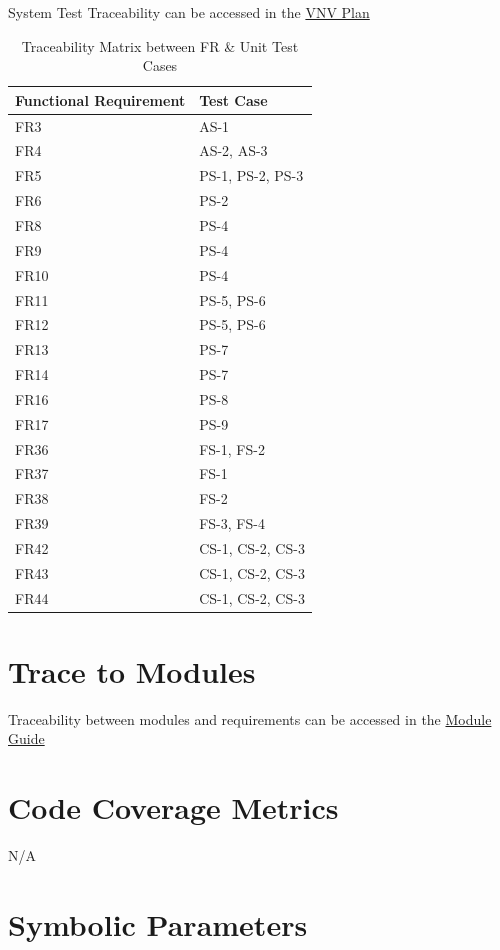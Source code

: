 \documentclass[12pt, titlepage]{article}
\begin{document}
System Test Traceability can be accessed in the \href{https://github.com/RutheniumVI/UnderTree/blob/main/docs/VnVPlan/VnVPlan.pdf}{VNV Plan}

\begin{longtable}{|l|l|}
    \caption{Traceability Matrix between FR \& Unit Test Cases}\\
    \hline
    Functional Requirement &  Test Case\\
    \hline
    FR3  & AS-1 \\
    FR4  & AS-2, AS-3 \\
    FR5  & PS-1, PS-2, PS-3\\
    FR6  & PS-2\\
    FR8  & PS-4\\
    FR9  & PS-4\\
    FR10  & PS-4\\
    FR11  & PS-5, PS-6\\
    FR12  & PS-5, PS-6\\
    FR13  & PS-7\\
    FR14  & PS-7\\
    FR16  & PS-8 \\
    FR17  & PS-9\\
    FR36  & FS-1, FS-2\\
    FR37  & FS-1\\
    FR38  & FS-2\\
    FR39  & FS-3, FS-4\\
    FR42  & CS-1, CS-2, CS-3\\
    FR43  & CS-1, CS-2, CS-3\\
    FR44  & CS-1, CS-2, CS-3\\
    \hline
\end{longtable}
	
\section{Trace to Modules}

Traceability between modules and requirements can be accessed in the \href{https://github.com/RutheniumVI/UnderTree/blob/main/docs/Design/MG/MG.pdf}{Module Guide}

\section{Code Coverage Metrics}

N/A

\newpage
\section{Symbolic Parameters}
\end{document}
